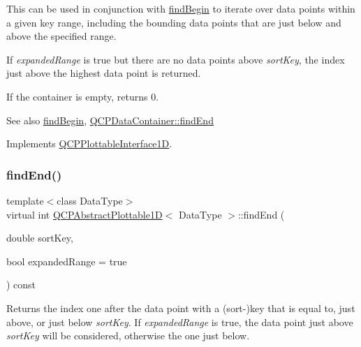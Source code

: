 This can be used in conjunction with \hyperlink{class_q_c_p_abstract_plottable1_d_ae6ead74a0d6a17954e1857f361b9ccf2}{find\+Begin} to iterate over data points within a given key range, including the bounding data points that are just below and above the specified range.

If {\itshape expanded\+Range} is true but there are no data points above {\itshape sort\+Key}, the index just above the highest data point is returned.

If the container is empty, returns 0.

\begin{DoxySeeAlso}{See also}
\hyperlink{class_q_c_p_abstract_plottable1_d_ae6ead74a0d6a17954e1857f361b9ccf2}{find\+Begin}, \hyperlink{class_q_c_p_data_container_afb8b8f23cc2b7234a793a25ce79fe48f}{Q\+C\+P\+Data\+Container\+::find\+End} 
\end{DoxySeeAlso}


Implements \hyperlink{class_q_c_p_plottable_interface1_d_a5deced1016bc55a41a2339619045b295}{Q\+C\+P\+Plottable\+Interface1D}.

\mbox{\label{class_q_c_p_abstract_plottable1_d_a02434e0e5599cd072225692f3469750b}} 
\subsubsection{\texorpdfstring{find\+End()}{findEnd()}\hspace{0.1cm}{\footnotesize\ttfamily [2/2]}}
{\footnotesize\ttfamily template$<$class Data\+Type$>$ \\
virtual int \hyperlink{class_q_c_p_abstract_plottable1_d}{Q\+C\+P\+Abstract\+Plottable1D}$<$ Data\+Type $>$\+::find\+End (\begin{DoxyParamCaption}\item[{double}]{sort\+Key,  }\item[{bool}]{expanded\+Range = {\ttfamily true} }\end{DoxyParamCaption}) const\hspace{0.3cm}{\ttfamily [virtual]}}

Returns the index one after the data point with a (sort-\/)key that is equal to, just above, or just below {\itshape sort\+Key}. If {\itshape expanded\+Range} is true, the data point just above {\itshape sort\+Key} will be considered, otherwise the one just below.

